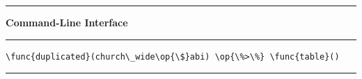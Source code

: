 \documentclass[
  letterpaper,
  DIV=11,
  numbers=noendperiod]{scrartcl}
\begin{document}
\begin{list}{}{\setlength\leftmargin{2.5em}}
  \item\noindent\rule[0.3ex]{\dimexpr\textwidth - 2.5em\relax}{1pt}\vspace{-2.5ex}
  \item\small \textbf{Command-Line Interface} \normalsize \vspace{-2.5ex}
  \item\noindent\rule[0.3ex]{\dimexpr\textwidth - 2.5em\relax}{0.4pt}\vspace{-0.8ex}
  
  \begin{codebox}
  \begin{Verbatim}[breaklines = true, breaksymbol = \textcolor{idlelinnum}{\scriptsize$\hookrightarrow$}, commandchars = \\\{\}]
\func{duplicated}(church\_wide\op{\$}abi) \op{\%>\%} \func{table}()
  \end{Verbatim}
  \end{codebox}

  \vspace{-4ex}
  \item\noindent\rule[0.3ex]{\dimexpr\textwidth - 2.5em\relax}{0.4pt}
\end{list}
\end{document}
